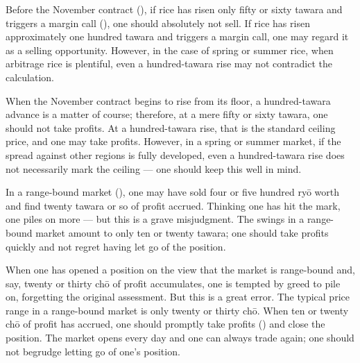 
\begin{sokyubox}
{\small\itshape\color{sokyubar} }

\medskip
Before the November contract (), if rice has
risen only fifty or sixty tawara and triggers a margin call
(), one should absolutely not sell. If rice has risen
approximately one hundred tawara and triggers a margin call, one may
regard it as a selling opportunity. However, in the case of spring or
summer rice, when arbitrage rice is plentiful, even a hundred-tawara rise
may not contradict the calculation.
\end{sokyubox}

\commentary
When the November contract begins to rise from its floor, a
hundred-tawara advance is a matter of course; therefore, at a mere fifty
or sixty tawara, one should not take profits. At a hundred-tawara rise,
that is the standard ceiling price, and one may take profits. However, in
a spring or summer market, if the spread against other regions is fully
developed, even a hundred-tawara rise does not necessarily mark the
ceiling --- one should keep this well in mind.


\begin{sokyubox}
{\small\itshape\color{sokyubar} }

\medskip
In a range-bound market (), one may have sold
four or five hundred ry\=o worth and find twenty tawara or so of profit
accrued. Thinking one has hit the mark, one piles on more --- but this is
a grave misjudgment. The swings in a range-bound market amount to only
ten or twenty tawara; one should take profits quickly and not regret
having let go of the position.
\end{sokyubox}

\commentary
When one has opened a position on the view that the market is range-bound
and, say, twenty or thirty ch\=o of profit accumulates, one is tempted by
greed to pile on, forgetting the original assessment. But this is a great
error. The typical price range in a range-bound market is only twenty or
thirty ch\=o. When ten or twenty ch\=o of profit has accrued, one should
promptly take profits () and close the position. The
market opens every day and one can always trade again; one should not
begrudge letting go of one's position.

